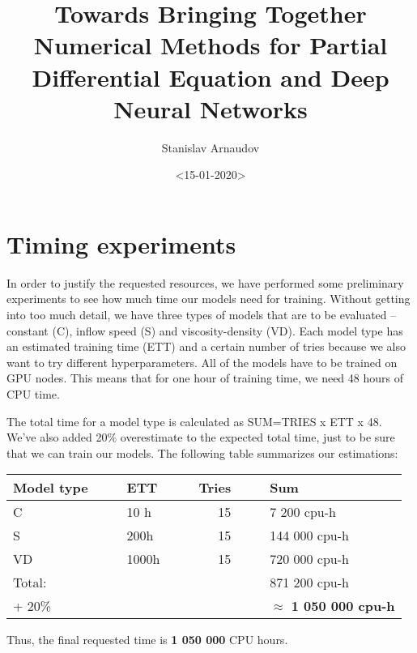 \documentclass{llncs}
\institute{Karlsruhe Institute of Technology,\\Kaiserstrasse 12,76131 Karlsruhe, Germany\\ \url{http://www.kit.edu/english/}}
\author{Stanislav Arnaudov}
\date{<15-01-2020>}
\title{Towards Bringing Together Numerical Methods for Partial Differential Equation and Deep Neural Networks}
\begin{document}
\maketitle


\section{Timing experiments}
\label{sec:orge340138}

In order to justify the requested resources, we have performed some preliminary experiments to see how much time our models need for training. Without getting into too much detail, we have three types of models that are to be evaluated -- constant (C), inflow speed (S) and viscosity-density (VD). Each model type has an estimated training time (ETT) and a certain number of tries because we also want to try different hyperparameters. All of the models have to be trained on GPU nodes. This means that for one hour of training time, we need 48 hours of CPU time.



The total time for a model type is calculated as SUM=TRIES x ETT x 48. We've also added 20\% overestimate to the expected total time, just to be sure that we can train our models. The following table summarizes our estimations:

\begin{center}
\begin{tabular}{l|lllllr|lll}
Model type &  &  & ETT &  &  & Tries &  &  & Sum\\
\hline
C &  &  & 10 h &  &  & 15 &  &  & 7 200 cpu-h\\
S &  &  & 200h &  &  & 15 &  &  & 144 000 cpu-h\\
VD &  &  & 1000h &  &  & 15 &  &  & 720 000 cpu-h\\
\hline
Total: &  &  &  &  &  &  &  &  & 871 200 cpu-h\\
+ 20\% &  &  &  &  &  &  &  &  & \(\approx\) \textbf{1 050 000 cpu-h}\\
\hline
\end{tabular}
\end{center}

Thus, the final requested time is \textbf{1 050 000} CPU hours.
\end{document}
